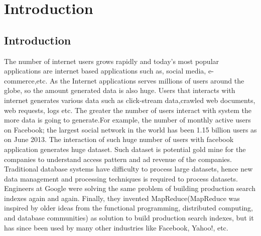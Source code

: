 
\chapter{Introduction} %

\label{Chapter1} %



\section{Introduction}

The number of internet users grows rapidly and today's most popular applications are internet based applications such as, social media, e-commerce,etc. As the Internet applications serves millions of users around the globe, so the amount generated data is also huge. Users that interacts with internet generates various data such as  click-stream data,crawled web documents, web requests, logs etc. The greater the number of users interact with system the more data is going to generate.For example, the number of monthly active users on Facebook; the largest social network in the world has been 1.15 billion users as on June 2013.\cite{fb1} The interaction of such huge number of users with facebook application generates huge dataset. Such dataset is potential gold mine for the companies to understand access pattern and ad revenue of the companies\cite{mat1}.\\ 

 Traditional database systems have difficulty to process large datasets, hence new data management and processing techniques is required to process datasets\cite{ieee1}. Engineers at Google were solving the same problem of building production search indexes again and again. Finally, they invented MapReduce(MapReduce was inspired by older ideas from the functional programming, distributed computing, and database communities) as solution to build production search indexes, but it has since been used by many other industries like Facebook, Yahoo!, etc.\\ 

